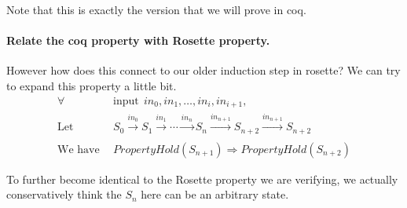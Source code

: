 \documentclass{article}
\begin{document}
Note that this is exactly the version that we will prove in coq.




\paragraph{Relate the coq property with Rosette property.}
However how does this connect to our older induction step in rosette?
We can try to expand this property a little bit.
\begin{align*}
\forall &~~ \text{input} ~~ in_0, in_1, \dots, in_i, in_{i+1}, \\
\text{Let} &~~ S_0 \xrightarrow[]{in_0} S_{1} \xrightarrow[]{in_1} \cdots \xrightarrow[]{in_n} S_{n} \xrightarrow[]{in_{n+1}} S_{n+2} \xrightarrow[]{in_{n+1}} S_{n+2} \\
\text{We have} &~~ PropertyHold(S_{n+1}) \Rightarrow PropertyHold(S_{n+2})
\end{align*}

To further become identical to the Rosette property we are verifying, we actually conservatively think the $S_{n}$ here can be an arbitrary state.








\end{document}
